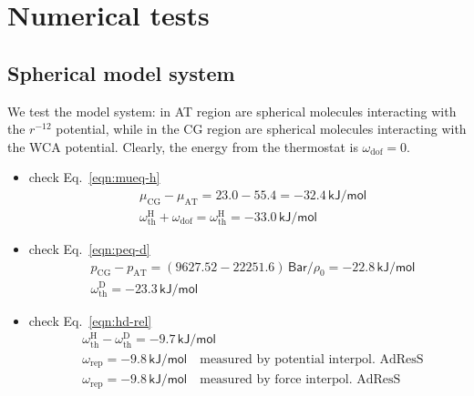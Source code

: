 \documentclass[aip,jcp,a4paper,reprint,onecolumn]{revtex4-1}
\newcommand{\AT}{{\textrm{{AT}}}}
\newcommand{\CG}{{\textrm{CG}}}
\newcommand{\thf}{{\textrm{th}}}
\newcommand{\dof}{{\textrm{dof}}}
\newcommand{\res}{{\textrm{rep}}}
\newcommand{\hadress}{{\textrm{H}}}
\newcommand{\dadress}{{\textrm{D}}}
\begin{document}
\section{Numerical tests}

\subsection {Spherical model system}
We test the model system: in AT region are spherical molecules
interacting with the $r^{-12}$ potential, while in the CG region are
spherical molecules interacting with the WCA potential. Clearly,
the energy from the thermostat is $\omega_\dof = 0$.
\begin{itemize}
\item check Eq.~\eqref{eqn:mueq-h}
  \begin{align}
  &\mu_\CG - \mu_\AT = 23.0 - 55.4 = -32.4 \,\textsf{kJ/mol}\\
  &\omega^\hadress_\thf + \omega_\dof = \omega^\hadress_\thf= -33.0  \,\textsf{kJ/mol}
  \end{align}
\item check Eq.~\eqref{eqn:peq-d}
  \begin{align}
    &p_\CG - p_\AT = (9627.52 - 22251.6) \,\textsf{Bar} / \rho_0 = - 22.8  \,\textsf{kJ/mol} \\
    &\omega^\dadress_\thf = - 23.3  \,\textsf{kJ/mol}
  \end{align}
\item check Eq.~\eqref{eqn:hd-rel}
  \begin{align}
    &\omega^\hadress_\thf - \omega^\dadress_\thf = -9.7 \,\textsf{kJ/mol}\\
    &\omega_\res = -9.8 \,\textsf{kJ/mol} \quad \textrm{measured by potential interpol. AdResS}\\
    &\omega_\res = -9.8 \,\textsf{kJ/mol} \quad \textrm{measured by force interpol. AdResS}
  \end{align}
\end{itemize}
\end{document}
